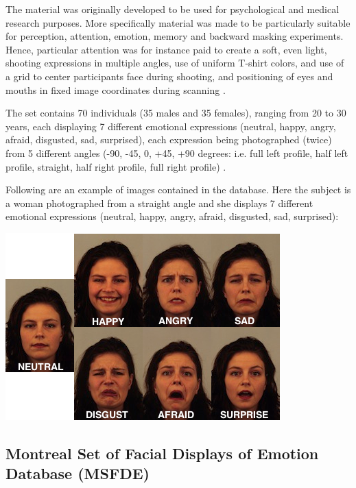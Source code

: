 \noindent The material was originally developed to be used for psychological and medical research purposes. More specifically material was made to be particularly suitable for perception, attention, emotion, memory and backward masking experiments. Hence, particular attention was for instance paid to create a soft, even light, shooting expressions in multiple angles, use of uniform T-shirt colors, and use of a grid to center participants face during shooting, and positioning of eyes and mouths in fixed image coordinates during scanning \cite{KDEF}.
\newline

\noindent The set contains 70 individuals (35 males and 35 females), ranging from 20 to 30 years, each displaying 7 different emotional expressions (neutral, happy, angry, afraid, disgusted, sad, surprised),
each expression being photographed (twice) from 5 different angles (-90, -45, 0, +45, +90 degrees: i.e. full left profile, half left profile, straight, half right profile, full right profile)  \cite{KDEF}.
\newline

\noindent Following are an example of images contained in the database. Here the subject is a woman photographed from a straight angle and she displays 7 different emotional expressions (neutral, happy, angry, afraid, disgusted, sad, surprised): 
\newline

\vspace{\baselineskip}
\begin{center}
\noindent \includegraphics[scale=0.7]{figures/kdef_7facialexpressions} 
\newline
\end{center} 

\subsection{Montreal Set of Facial Displays of Emotion Database (MSFDE)}

